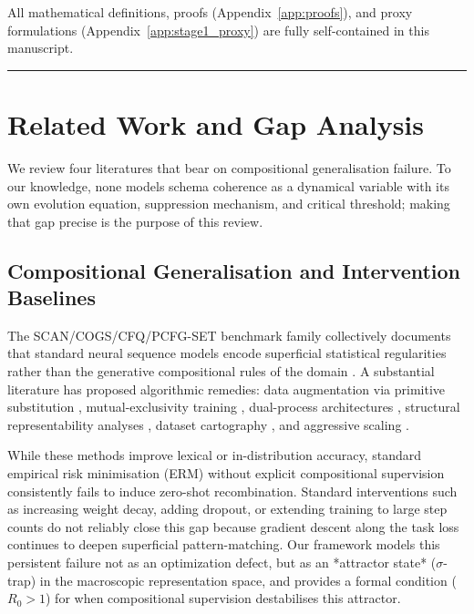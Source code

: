 \documentclass{article}
\theoremstyle{definition}
\begin{document}
All mathematical definitions, proofs (Appendix~\ref{app:proofs}), and proxy formulations (Appendix~\ref{app:stage1_proxy}) are fully self-contained in this manuscript.

\noindent\rule{\linewidth}{0.4pt}

\section{Related Work and Gap Analysis}\label{sec:related-work}

We review four literatures that bear on compositional generalisation
failure. To our knowledge, none models schema coherence as a dynamical
variable with its own evolution equation, suppression mechanism, and
critical threshold; making that gap precise is the purpose of this
review.

\subsection{Compositional Generalisation and Intervention Baselines}\label{sec:compositional-generalisation}

The SCAN/COGS/CFQ/PCFG-SET benchmark family collectively documents that standard neural sequence models encode superficial statistical regularities rather than the generative compositional rules of the domain \citep{lake2018generalizationwithoutsystematicity,
kim2020cogscompositionalgeneralizationchallenge,hupkes2020compositionalitydecomposed,mondorf2026compositionalarc}.
A substantial literature has proposed algorithmic remedies: data augmentation via primitive substitution \citep{andreas2020goodenoughcompositionaldataaug}, mutual-exclusivity training \citep{jiang2022mutualexclusivity}, dual-process architectures \citep{noviello2025neuroscienceinspiredualprocess}, structural representability analyses \citep{bruns2025exploringcompositionalgeneralizationin}, dataset cartography \citep{swayamdipta2020datasetcartography}, and aggressive scaling \citep{redhardt2025}. 

While these methods improve lexical or in-distribution accuracy, standard empirical risk minimisation (ERM) without explicit compositional supervision consistently fails to induce zero-shot recombination. Standard interventions such as increasing weight decay, adding dropout, or extending training to large step counts do not reliably close this gap because gradient descent along the task loss continues to deepen superficial pattern-matching. Our framework models this persistent failure not as an optimization defect, but as an *attractor state* ($\sigma$-trap) in the macroscopic representation space, and provides a formal condition ($R_0 > 1$) for when compositional supervision destabilises this attractor.
\end{document}
